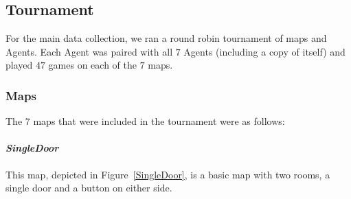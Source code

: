 \documentclass{IEEEtran}
\begin{document}

\subsection{Tournament}
For the main data collection, we ran a round robin tournament of maps and Agents. Each Agent was paired with all $7$ Agents (including a copy of itself) and played $47$ games on each of the $7$ maps. 

\subsubsection{Maps}
The $7$ maps that were included in the tournament were as follows:

\paragraph{\emph{SingleDoor}} This map, depicted in Figure~\ref{SingleDoor}, is a basic map with two rooms, a single door and a button on either side.
\end{document}
